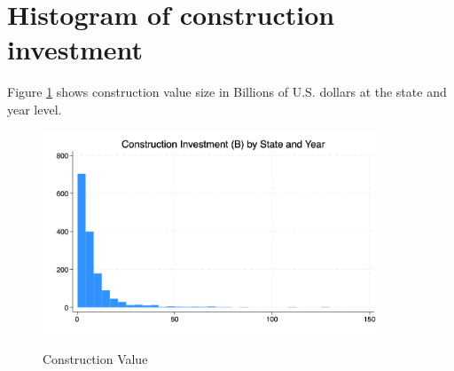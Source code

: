 \documentclass[12pt]{article}
\begin{document}
\section{Histogram of construction investment}
Figure \ref{fig:hist1} shows construction value size in Billions of U.S. dollars at the state and year level.
\vspace*{\baselineskip}

\begin{figure}[hp]
    \centering
    \caption{Construction Value} 
    \includegraphics[width=0.9\textwidth]{histinv.jpg}
    \label{fig:hist1}
\end{figure}
    \begin{center} \vspace*{-\baselineskip}
        \footnotesize {}
    \end{center}
\end{document}
